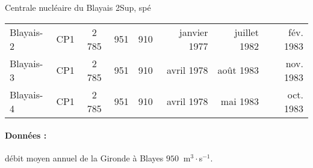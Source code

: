 \begin{exercise}{Centrale nucléaire du Blayais  }{2}{Sup, spé}
\begin{table}[H]
\begin{tabularx}{\linewidth}{llCCCrrr}
Blayais-2                                                                                              & CP1                                                  & 2 785                                         & 951                                      & 910                                      & janvier 1977                                                                                          & juillet 1982                                                                                              & fév. 1983                                                                                                    \\
Blayais-3                                                                                              & CP1                                                  & 2 785                                         & 951                                      & 910                                      & avril 1978                                                                                            & août 1983                                                                                                 & nov. 1983                                                                                                   \\
Blayais-4                                                                                              & CP1                                                  & 2 785                                         & 951                                      & 910                                      & avril 1978                                                                                            & mai 1983                                                                                                  & oct. 1983                                                                                                      
\end{tabularx}
\end{table}

\paragraph{Données :} débit moyen annuel de la Gironde à Blayes $\SI{950}{}$ m$^3\cdot$s$^{-1}$.

\end{exercise}

